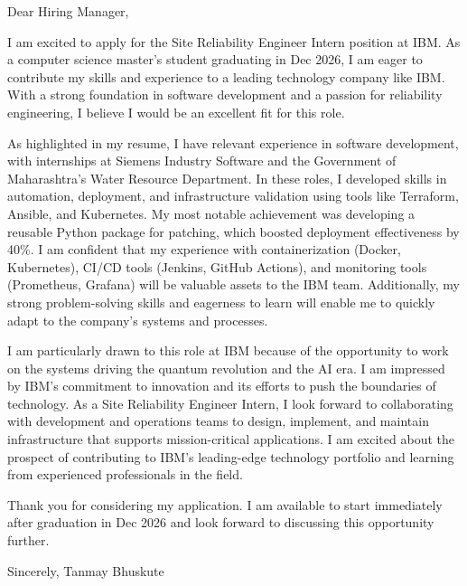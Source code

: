 \documentclass[11pt, letterpaper]{article}
\begin{document}
Dear Hiring Manager,

I am excited to apply for the Site Reliability Engineer Intern position at IBM. As a computer science master's student graduating in Dec 2026, I am eager to contribute my skills and experience to a leading technology company like IBM. With a strong foundation in software development and a passion for reliability engineering, I believe I would be an excellent fit for this role.

As highlighted in my resume, I have relevant experience in software development, with internships at Siemens Industry Software and the Government of Maharashtra's Water Resource Department. In these roles, I developed skills in automation, deployment, and infrastructure validation using tools like Terraform, Ansible, and Kubernetes. My most notable achievement was developing a reusable Python package for patching, which boosted deployment effectiveness by 40\%. I am confident that my experience with containerization (Docker, Kubernetes), CI/CD tools (Jenkins, GitHub Actions), and monitoring tools (Prometheus, Grafana) will be valuable assets to the IBM team. Additionally, my strong problem-solving skills and eagerness to learn will enable me to quickly adapt to the company's systems and processes.

I am particularly drawn to this role at IBM because of the opportunity to work on the systems driving the quantum revolution and the AI era. I am impressed by IBM's commitment to innovation and its efforts to push the boundaries of technology. As a Site Reliability Engineer Intern, I look forward to collaborating with development and operations teams to design, implement, and maintain infrastructure that supports mission-critical applications. I am excited about the prospect of contributing to IBM's leading-edge technology portfolio and learning from experienced professionals in the field.

Thank you for considering my application. I am available to start immediately after graduation in Dec 2026 and look forward to discussing this opportunity further.

Sincerely,
Tanmay Bhuskute
\end{document}
